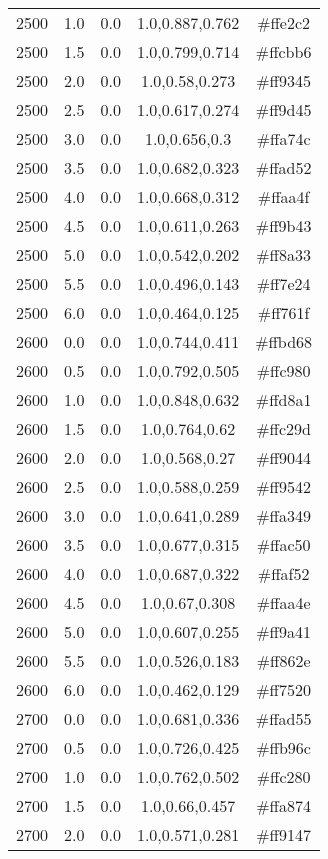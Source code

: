 \begin{tabular}{ccccc}
2500 & 1.0 & 0.0 & 1.0,0.887,0.762 & \#ffe2c2 \\ 
2500 & 1.5 & 0.0 & 1.0,0.799,0.714 & \#ffcbb6 \\ 
2500 & 2.0 & 0.0 & 1.0,0.58,0.273 & \#ff9345 \\ 
2500 & 2.5 & 0.0 & 1.0,0.617,0.274 & \#ff9d45 \\ 
2500 & 3.0 & 0.0 & 1.0,0.656,0.3 & \#ffa74c \\ 
2500 & 3.5 & 0.0 & 1.0,0.682,0.323 & \#ffad52 \\ 
2500 & 4.0 & 0.0 & 1.0,0.668,0.312 & \#ffaa4f \\ 
2500 & 4.5 & 0.0 & 1.0,0.611,0.263 & \#ff9b43 \\ 
2500 & 5.0 & 0.0 & 1.0,0.542,0.202 & \#ff8a33 \\ 
2500 & 5.5 & 0.0 & 1.0,0.496,0.143 & \#ff7e24 \\ 
2500 & 6.0 & 0.0 & 1.0,0.464,0.125 & \#ff761f \\ 
2600 & 0.0 & 0.0 & 1.0,0.744,0.411 & \#ffbd68 \\ 
2600 & 0.5 & 0.0 & 1.0,0.792,0.505 & \#ffc980 \\ 
2600 & 1.0 & 0.0 & 1.0,0.848,0.632 & \#ffd8a1 \\ 
2600 & 1.5 & 0.0 & 1.0,0.764,0.62 & \#ffc29d \\ 
2600 & 2.0 & 0.0 & 1.0,0.568,0.27 & \#ff9044 \\ 
2600 & 2.5 & 0.0 & 1.0,0.588,0.259 & \#ff9542 \\ 
2600 & 3.0 & 0.0 & 1.0,0.641,0.289 & \#ffa349 \\ 
2600 & 3.5 & 0.0 & 1.0,0.677,0.315 & \#ffac50 \\ 
2600 & 4.0 & 0.0 & 1.0,0.687,0.322 & \#ffaf52 \\ 
2600 & 4.5 & 0.0 & 1.0,0.67,0.308 & \#ffaa4e \\ 
2600 & 5.0 & 0.0 & 1.0,0.607,0.255 & \#ff9a41 \\ 
2600 & 5.5 & 0.0 & 1.0,0.526,0.183 & \#ff862e \\ 
2600 & 6.0 & 0.0 & 1.0,0.462,0.129 & \#ff7520 \\ 
2700 & 0.0 & 0.0 & 1.0,0.681,0.336 & \#ffad55 \\ 
2700 & 0.5 & 0.0 & 1.0,0.726,0.425 & \#ffb96c \\ 
2700 & 1.0 & 0.0 & 1.0,0.762,0.502 & \#ffc280 \\ 
2700 & 1.5 & 0.0 & 1.0,0.66,0.457 & \#ffa874 \\ 
2700 & 2.0 & 0.0 & 1.0,0.571,0.281 & \#ff9147 \\ 

\end{tabular}
